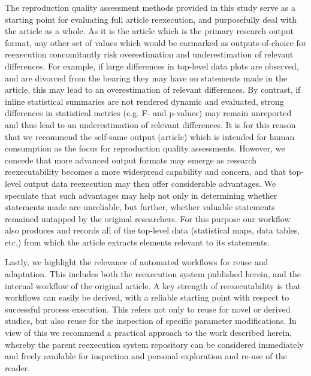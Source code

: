 The reproduction quality assessment methods provided in this study serve as a starting point for evaluating full article reexecution, and purposefully deal with the article as a whole.
As it is the article which is the primary research output format, any other set of values which would be earmarked as outputs-of-choice for reexecution concomitantly risk overestimation and underestimation of relevant differences.
For example, if large differences in top-level data plots are observed, and are divorced from the bearing they may have on statements made in the article, this may lead to an overestimation of relevant differences.
By contrast, if inline statistical summaries are not rendered dynamic and evaluated, strong differences in statistical metrics (e.g. F- and p-values) may remain unreported and thus lead to an underestimation of relevant differences.
It is for this reason that we recommend the self-same output (article) which is intended for human consumption as the focus for reproduction quality assessments.
However, we concede that more advanced output formats may emerge as research reexecutability becomes a more widespread capability and concern, and that top-level output data reexecution may then offer considerable advantages.
We speculate that such advantages may help not only in determining whether statements made are unreliable, but further, whether valuable statements remained untapped by the original researchers.
For this purpose our workflow also produces and records all of the top-level data (statistical maps, data tables, etc.) from which the article extracts elements relevant to its statements.

Lastly, we highlight the relevance of automated workflows for reuse and adaptation.
This includes both the reexecution system published herein, and the internal workflow of the original article.
A key strength of reexecutability is that workflows can easily be derived, with a reliable starting point with respect to successful process execution.
This refers not only to reuse for novel or derived studies, but also reuse for the inspection of specific parameter modifications.
In view of this we recommend a practical approach to the work described herein, whereby the parent reexecution system repository can be considered immediately and freely available for inspection and personal exploration and re-use of the reader.

